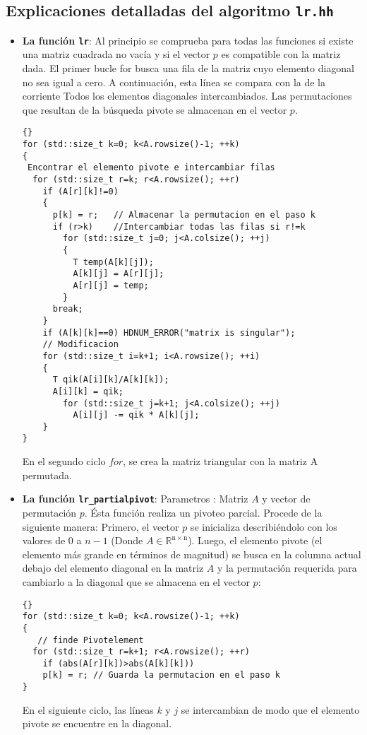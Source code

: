 \subsection{Explicaciones detalladas del algoritmo \lstinline{lr.hh}}
\begin{itemize}
\item \textbf{La función \lstinline{lr}}: Al principio se comprueba para todas 
las funciones si existe una matriz cuadrada no vacía y si el vector $p$ 
es compatible con la matriz dada. El primer bucle for busca una fila de
la matriz cuyo elemento diagonal no sea igual a cero. A continuación, 
esta línea se compara con la de la corriente Todos los elementos diagonales
intercambiados. Las permutaciones que resultan de la búsqueda pivote 
se almacenan en el vector $p$.

{\footnotesize{\begin{lstlisting}{}
for (std::size_t k=0; k<A.rowsize()-1; ++k)
{
 Encontrar el elemento pivote e intercambiar filas
  for (std::size_t r=k; r<A.rowsize(); ++r)
    if (A[r][k]!=0)
    {
      p[k] = r;   // Almacenar la permutacion en el paso k
      if (r>k)    //Intercambiar todas las filas si r!=k
        for (std::size_t j=0; j<A.colsize(); ++j)
        {
          T temp(A[k][j]);
          A[k][j] = A[r][j];
          A[r][j] = temp;
        }
      break;
    }
    if (A[k][k]==0) HDNUM_ERROR("matrix is singular");
    // Modificacion
    for (std::size_t i=k+1; i<A.rowsize(); ++i)
    {
      T qik(A[i][k]/A[k][k]);
      A[i][k] = qik;
        for (std::size_t j=k+1; j<A.colsize(); ++j)
          A[i][j] -= qik * A[k][j];
    }
}
\end{lstlisting}}}

  En el segundo ciclo $for$, se crea la matriz triangular con la matriz A
  permutada.

\item \textbf{La función \lstinline{lr_partialpivot}}: Parametros :
  Matriz $A$ y vector de permutación $p$.  Ésta función realiza un pivoteo parcial.
  Procede de la siguiente manera: Primero, el vector $p$ se inicializa describiéndolo
  con los valores de $0$ a $n-1$ (Donde $A \in \mathbb{R^{\mathrm{n}\times \mathrm{n}}}$).  
  Luego, el elemento pivote (el elemento más grande en términos de magnitud) se busca en la columna actual
  debajo del elemento diagonal en la matriz $A$ y la permutación requerida para cambiarlo
  a la diagonal que se almacena en el vector $p$:

{\footnotesize{\begin{lstlisting}{}
for (std::size_t k=0; k<A.rowsize()-1; ++k)
{
   // finde Pivotelement
  for (std::size_t r=k+1; r<A.rowsize(); ++r)
    if (abs(A[r][k])>abs(A[k][k]))
    p[k] = r; // Guarda la permutacion en el paso k
}
\end{lstlisting}}}
  En el siguiente ciclo, las líneas $k$ y $j$ se intercambian de modo que 
  el elemento pivote se encuentre en la diagonal.


\end{itemize}
